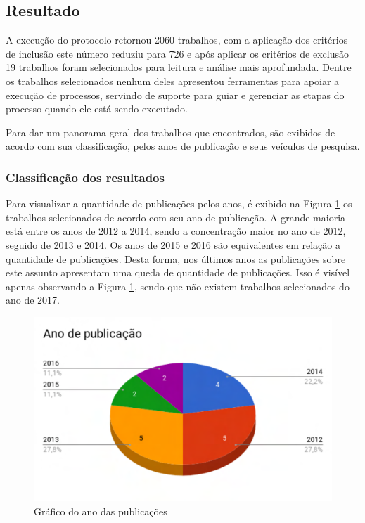 \subsection{Resultado}\label{sub:trabalhosRelacionados_resultados}
A execução do protocolo retornou 2060 trabalhos, com a aplicação dos critérios de inclusão este número reduziu para 726 e após aplicar os critérios de exclusão 19 trabalhos foram selecionados para leitura e análise mais aprofundada. Dentre os trabalhos selecionados nenhum deles apresentou ferramentas para apoiar a execução de processos, servindo de suporte para guiar e gerenciar as etapas do processo quando ele está sendo executado.

Para dar um panorama geral dos trabalhos que encontrados, são exibidos de acordo com sua classificação, pelos anos de publicação e seus veículos de pesquisa.

\subsubsection{Classificação dos resultados}
Para visualizar a quantidade de publicações pelos anos, é exibido na Figura \ref{fig:ano} os trabalhos selecionados de acordo com seu ano de publicação. A grande maioria está entre os anos de 2012 a 2014, sendo a concentração maior no ano de 2012, seguido de 2013 e 2014. Os anos de 2015 e 2016 são equivalentes em relação a quantidade de publicações. Desta forma, nos últimos anos as publicações sobre este assunto apresentam uma queda de quantidade de publicações. Isso é visível apenas observando a Figura \ref{fig:ano}, sendo que não existem trabalhos selecionados do ano de 2017.
\begin{figure}[!htb]
	\caption{Gráfico do ano das publicações}\label{fig:ano}
	\begin{center}
		\includegraphics[scale=0.6]{img/GrafAno}
	\end{center}
\end{figure}

